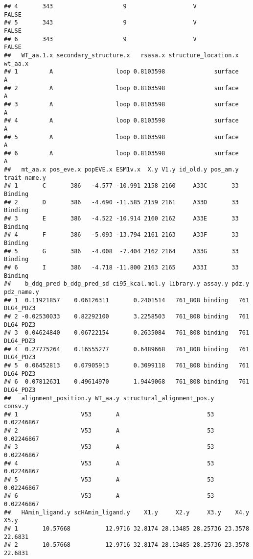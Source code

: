 \documentclass[
]{article}
\begin{document}
\begin{verbatim}
## 4       343                    9                   V                  FALSE
## 5       343                    9                   V                  FALSE
## 6       343                    9                   V                  FALSE
##   WT_aa.1.x secondary_structure.x   rsasa.x structure_location.x wt_aa.x
## 1         A                  loop 0.8103598              surface       A
## 2         A                  loop 0.8103598              surface       A
## 3         A                  loop 0.8103598              surface       A
## 4         A                  loop 0.8103598              surface       A
## 5         A                  loop 0.8103598              surface       A
## 6         A                  loop 0.8103598              surface       A
##   mt_aa.x pos_eve.x popEVE.x ESM1v.x  X.y V1.y id_old.y pos_am.y trait_name.y
## 1       C       386   -4.577 -10.991 2158 2160     A33C       33      Binding
## 2       D       386   -4.690 -11.585 2159 2161     A33D       33      Binding
## 3       E       386   -4.522 -10.914 2160 2162     A33E       33      Binding
## 4       F       386   -5.093 -13.794 2161 2163     A33F       33      Binding
## 5       G       386   -4.008  -7.404 2162 2164     A33G       33      Binding
## 6       I       386   -4.718 -11.800 2163 2165     A33I       33      Binding
##    b_ddg_pred b_ddg_pred_sd ci95_kcal.mol.y library.y assay.y pdz.y pdz_name.y
## 1  0.11921857    0.06126311       0.2401514   761_808 binding   761  DLG4_PDZ3
## 2 -0.02530033    0.82292100       3.2258503   761_808 binding   761  DLG4_PDZ3
## 3  0.04624840    0.06722154       0.2635084   761_808 binding   761  DLG4_PDZ3
## 4  0.27775264    0.16555277       0.6489668   761_808 binding   761  DLG4_PDZ3
## 5  0.06452813    0.07905913       0.3099118   761_808 binding   761  DLG4_PDZ3
## 6  0.07812631    0.49614970       1.9449068   761_808 binding   761  DLG4_PDZ3
##   alignment_position.y WT_aa.y structural_alignment_pos.y    consv.y
## 1                  V53       A                         53 0.02246867
## 2                  V53       A                         53 0.02246867
## 3                  V53       A                         53 0.02246867
## 4                  V53       A                         53 0.02246867
## 5                  V53       A                         53 0.02246867
## 6                  V53       A                         53 0.02246867
##   HAmin_ligand.y scHAmin_ligand.y    X1.y     X2.y     X3.y    X4.y    X5.y
## 1       10.57668          12.9716 32.8174 28.13485 28.25736 23.3578 22.6831
## 2       10.57668          12.9716 32.8174 28.13485 28.25736 23.3578 22.6831

\end{verbatim}
\end{document}
